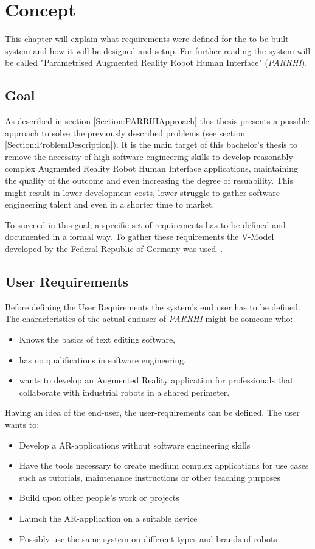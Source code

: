 \chapter{Concept}\label{Chap:Concept}

This chapter will explain what requirements were defined for the to be built system and how it will be designed and setup. For further reading the system will be called "Parametrised Augmented Reality Robot Human Interface" (\textit{PARRHI}).

\section{Goal}
As described in section \ref{Section:PARRHIApproach} this thesis presents a possible approach to solve the previously described problems (see section \ref{Section:ProblemDescription}). It is the main target of this bachelor's thesis to remove the necessity of high software engineering skills to develop reasonably complex Augmented Reality Robot Human Interface applications, maintaining the quality of the outcome and even increasing the degree of resuability. This might result in lower development costs, lower struggle to gather software engineering talent and even in a shorter time to market.

To succeed in this goal, a specific set of requirements has to be defined and documented in a formal way. To gather these requirements the V-Model developed by the Federal Republic of Germany was used~\cite{vmodell}.

\section{User Requirements}
Before defining the User Requirements the system's end user has to be defined. The characteristics of the actual enduser of \textit{PARRHI} might be someone who:
\begin{itemize}
	\setlength\itemsep{-1em}
	\item Knows the basics of text editing software,
	\item has no qualifications in software engineering,
	\item wants to develop an Augmented Reality application for professionals that collaborate with industrial robots in a shared perimeter.
\end{itemize}

Having an idea of the end-user, the user-requirements can be defined. The user wants to:
\begin{itemize}
	\setlength\itemsep{-1em}
	\item Develop a AR-applications without software engineering skills
	\item Have the tools necessary to create medium complex applications for use cases such as tutorials, maintenance instructions or other teaching purposes
	\item Build upon other people's work or projects
	\item Launch the AR-application on a suitable device
	\item Possibly use the same system on different types and brands of robots
\end{itemize}

